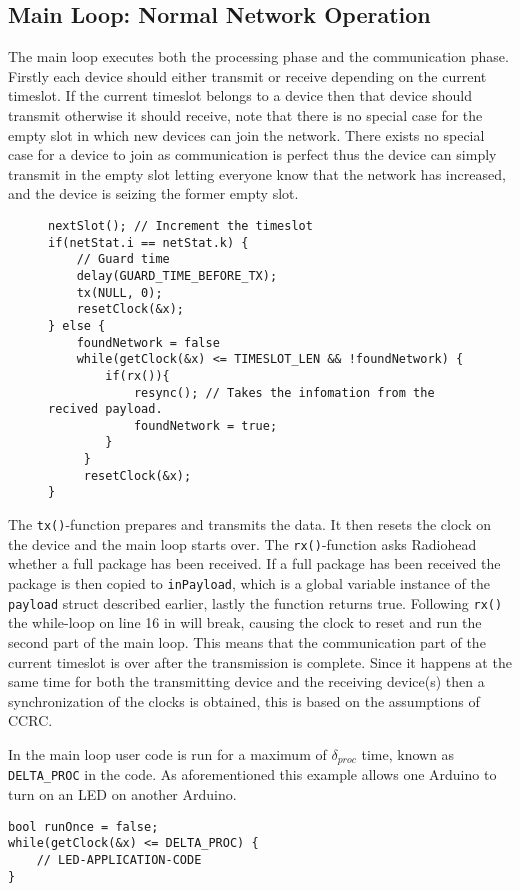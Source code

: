 \subsection{Main Loop: Normal Network Operation}
The main loop executes both the processing phase and the communication phase.
Firstly each device should either transmit or receive depending on the current timeslot. 
If the current timeslot belongs to a device then that device should transmit otherwise it should receive, note that there is no special case for the empty slot in which new devices can join the network.
There exists no special case for a device to join as communication is perfect thus the device can simply transmit in the empty slot letting everyone know that the network has increased, and the device is seizing the former empty slot.
\begin{figure}
\begin{lstlisting}[style=customc,caption={Main loop deciding whether to transmit or receive.},label={lst:ccrc:rxortx}]
nextSlot(); // Increment the timeslot
if(netStat.i == netStat.k) {
    // Guard time
    delay(GUARD_TIME_BEFORE_TX);
    tx(NULL, 0);
    resetClock(&x);
} else {
    foundNetwork = false
    while(getClock(&x) <= TIMESLOT_LEN && !foundNetwork) {
        if(rx()){
            resync(); // Takes the infomation from the recived payload.
            foundNetwork = true;
        }
     }
     resetClock(&x);
}
\end{lstlisting}
\end{figure}

\bigskip \noindent
The \texttt{tx()}-function prepares and transmits the data.
It then resets the clock on the device and the main loop starts over.
The \texttt{rx()}-function asks Radiohead whether a full package has been received. 
If a full package has been received the package is then copied to \texttt{inPayload}, which is a global variable instance of the \texttt{payload} struct described earlier, lastly the function returns true.
Following \texttt{rx()} the while-loop on line 16 in  will break, causing the clock to reset and run the second part of the main loop.
This means that the communication part of the current timeslot is over after the transmission is complete.
Since it happens at the same time for both the transmitting device and the receiving device(s) then a synchronization of the clocks is obtained, this is based on the assumptions of CCRC. 
 
In the main loop user code is run for a maximum of $\delta_{proc}$ time, known as \texttt{DELTA\_PROC} in the code.
As aforementioned this example allows one Arduino to turn on an LED on another Arduino. 

\begin{lstlisting}[style=customc,caption={While-loop with application code.},label={lst:ccrc:usercode}]
bool runOnce = false;
while(getClock(&x) <= DELTA_PROC) {
    // LED-APPLICATION-CODE
}
\end{lstlisting}